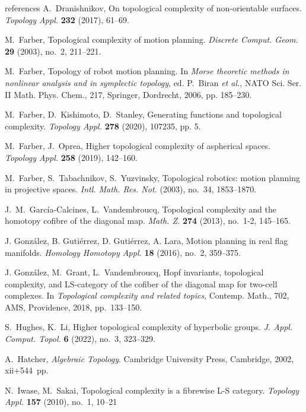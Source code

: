 \documentclass[amscd,amssymb,verbatim,10pt]{amsart}
\numberwithin{equation}{section}
\theoremstyle{plain}
\theoremstyle{definition}
\begin{document}
\begin{thebibliography}{references}
 A.~Dranishnikov, On topological complexity of non-orientable surfaces. \emph{Topology Appl.} \textbf{232} (2017), 61--69.

 M.~Farber, Topological complexity of motion planning. \emph{Discrete Comput. Geom.} \textbf{29} (2003), no.~2, 211--221.

 M.~Farber, Topology of robot motion planning. In \textit{Morse theoretic methods in nonlinear analysis and in symplectic topology}, ed. P.~Biran \textit{et al.}, NATO Sci. Ser. II Math. Phys. Chem., 217, Springer, Dordrecht, 2006, pp. 185--230.


 M.~Farber, D.~Kishimoto, D.~Stanley, Generating functions and topological complexity. \textit{Topology Appl.} \textbf{278} (2020), 107235, pp. 5.

 M.~Farber, J.~Oprea, Higher topological complexity of aspherical spaces. \textit{Topology Appl.} \textbf{258} (2019), 142--160.

 M.~Farber, S.~Tabachnikov, S.~Yuzvinsky, Topological robotics: motion planning in projective spaces. \emph{Intl. Math. Res. Not.} (2003), no.~34, 1853--1870.

 J.~M.~Garc\'ia-Calcines, L.~Vandembroucq, Topological complexity and the homotopy cofibre of the diagonal map. \emph{Math. Z.} \textbf{274} (2013), no.~1-2, 145--165.

 J. Gonz\'alez, B. Guti\'errez, D. Guti\'errez, A. Lara, Motion planning in real flag manifolds. \emph{Homology Homotopy Appl.} \textbf{18} (2016), no.~2, 359--375.

 J. Gonz\'alez, M.~Grant, L.~Vandembroucq, Hopf invariants, topological complexity, and LS-category of the cofiber of the diagonal map for two-cell complexes. In \emph{Topological complexity and related topics}, Contemp. Math., 702, AMS, Providence, 2018, pp.~133--150.

 S.~Hughes, K.~Li, Higher topological complexity of hyperbolic groups. \emph{J. Appl. Comput. Topol.} \textbf{6} (2022), no.~3, 323--329.


 A.~Hatcher, {\em Algebraic Topology}. Cambridge University Press, Cambridge, 2002, xii+544~pp.

 N.~Iwase, M.~Sakai, Topological complexity is a fibrewise L-S category. \emph{Topology Appl.} \textbf{157} (2010), no.~1, 10--21


\end{thebibliography}
\end{document}
